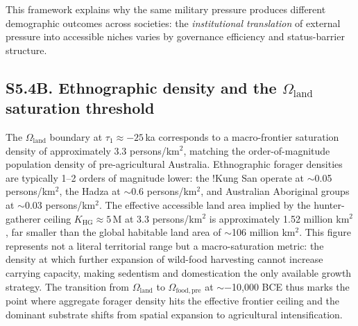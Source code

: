 \documentclass[11pt]{article}
\begin{document}
This framework explains why the same military pressure produces different demographic outcomes across societies: the \emph{institutional translation} of external pressure into accessible niches varies by governance efficiency and status-barrier structure.

\subsection*{S5.4B. Ethnographic density and the $\Omega_{\mathrm{land}}$ saturation threshold}

The $\Omega_{\mathrm{land}}$ boundary at $\tau_1\approx -25$\,ka corresponds to a macro-frontier saturation density of approximately 3.3 persons/km$^2$, matching the order-of-magnitude population density of pre-agricultural Australia. Ethnographic forager densities are typically 1--2 orders of magnitude lower: the !Kung San operate at $\sim$0.05 persons/km$^2$, the Hadza at $\sim$0.6 persons/km$^2$, and Australian Aboriginal groups at $\sim$0.03 persons/km$^2$. The effective accessible land area implied by the hunter-gatherer ceiling $K_{\mathrm{HG}}\approx 5$\,M at 3.3 persons/km$^2$ is approximately 1.52 million km$^2$, far smaller than the global habitable land area of $\sim$106 million km$^2$. This figure represents not a literal territorial range but a macro-saturation metric: the density at which further expansion of wild-food harvesting cannot increase carrying capacity, making sedentism and domestication the only available growth strategy. The transition from $\Omega_{\mathrm{land}}$ to $\Omega_{\mathrm{food,pre}}$ at $\sim -$10,000 BCE thus marks the point where aggregate forager density hits the effective frontier ceiling and the dominant substrate shifts from spatial expansion to agricultural intensification.
\end{document}
